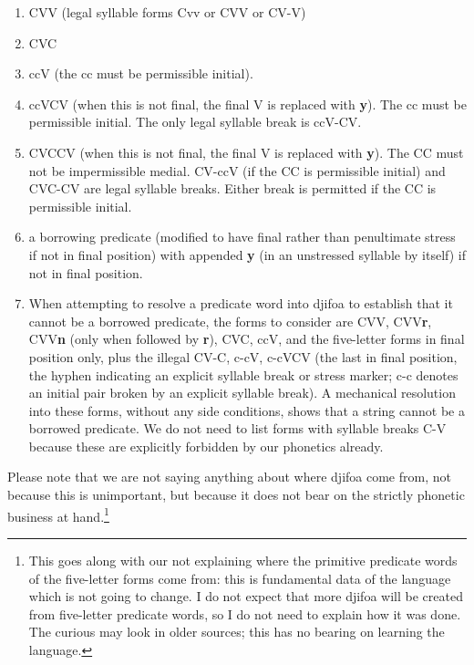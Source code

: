 \documentclass[12pt]{book}
\begin{document}
\begin{enumerate}

\item CVV (legal syllable forms Cvv or CVV or CV-V)

\item CVC

\item ccV  (the cc must be permissible initial).

\item ccVCV (when this is not final, the final V is replaced with {\bf y}).  The cc must be permissible initial.  The only legal syllable break is ccV-CV.

\item CVCCV (when this is not final, the final V is replaced with {\bf y}).  The CC must not be impermissible medial.  CV-ccV (if the CC is permissible initial) and CVC-CV are legal syllable breaks.  Either break is permitted if the CC is permissible initial.

\item a borrowing predicate (modified to have final rather than penultimate stress if not in final position) with appended {\bf y} (in an unstressed syllable by itself) if not in final position.

\item When attempting to resolve a predicate word into djifoa to establish that it cannot be a borrowed predicate, the forms to consider are CVV, CVV{\bf r}, CVV{\bf n} (only when followed by {\bf r}),
CVC, ccV, and the five-letter forms in final position only, plus the illegal CV-C, c-cV, c-cVCV (the last in final position, the hyphen indicating an explicit syllable break or stress marker; c-c denotes an initial pair broken by an explicit syllable break).   A mechanical resolution into these forms, without any side conditions, shows that a string cannot be a borrowed predicate.   We do not need to list forms with syllable breaks C-V because these are explicitly forbidden by our phonetics already.

\end{enumerate}

Please note that we are not saying anything about where djifoa come from, not because this is unimportant, but because it does not bear on the strictly phonetic business at hand.\footnote{This goes along with our not explaining where the primitive predicate words of the five-letter forms come from:  this is fundamental data of the language which is not going to change.  I do not expect that more djifoa will be created from five-letter predicate words, so I do not need to explain how it was done.   The curious may look in older sources; this has no bearing on learning the language.}
\end{document}
